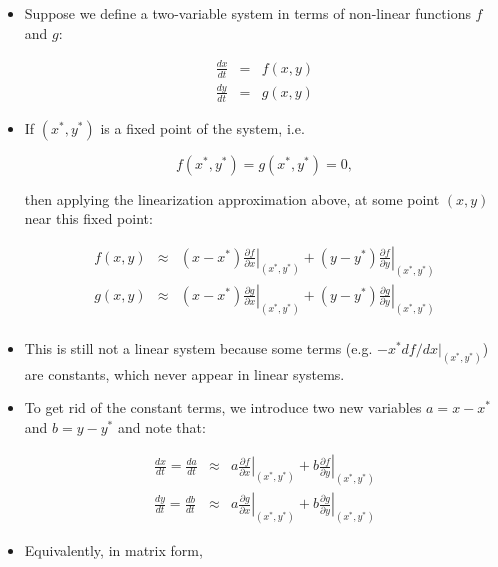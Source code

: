 \documentclass{article}
\begin{document}
\begin{itemize}

\item Suppose we define a two-variable system in terms of non-linear functions $f$ and $g$:

\begin{eqnarray*}
\frac{dx}{dt} & = & f(x,y)\\
\frac{dy}{dt} & = & g(x,y)
\end{eqnarray*}

\item If $(x^*, y^*)$ is a fixed point of the system, i.e.

\[ f \left( x^*,y^* \right) = g \left( x^*,y^* \right)  = 0, \]

then applying the linearization approximation above, at some point $(x,y)$ near this fixed point:

\begin{eqnarray*}
f \left( x,y \right) & \approx & \left( x - x^* \right) \left. \frac{\partial f}{\partial x} \right|_{(x^*,y^*)} + \left( y - y^* \right) \left.  \frac{\partial f}{\partial y} \right|_{(x^*,y^*)}\\
g \left( x,y \right) & \approx & \left( x - x^* \right) \left. \frac{\partial g}{\partial x} \right|_{(x^*,y^*)} + \left( y - y^* \right) \left.  \frac{\partial g}{\partial y} \right|_{(x^*,y^*)}\\
\end{eqnarray*}

\item This is still not a linear system because some terms (e.g. $-x^* df/dx |_{(x^*,y^*)}$) are constants, which never appear in linear systems.

\item To get rid of the constant terms, we introduce two new variables $a=x-x^*$ and $b=y-y^*$ and note that:

\begin{eqnarray*}
\frac{dx}{dt} = \frac{da}{dt} & \approx & a \left. \frac{\partial f}{\partial x} \right|_{(x^*,y^*)} + b \left.  \frac{\partial f}{\partial y} \right|_{(x^*,y^*)}\\
\frac{dy}{dt} = \frac{db}{dt} & \approx & a \left. \frac{\partial g}{\partial x} \right|_{(x^*,y^*)} + b \left.  \frac{\partial g}{\partial y} \right|_{(x^*,y^*)}
\end{eqnarray*}

\item Equivalently, in matrix form,


\end{itemize}
\end{document}
